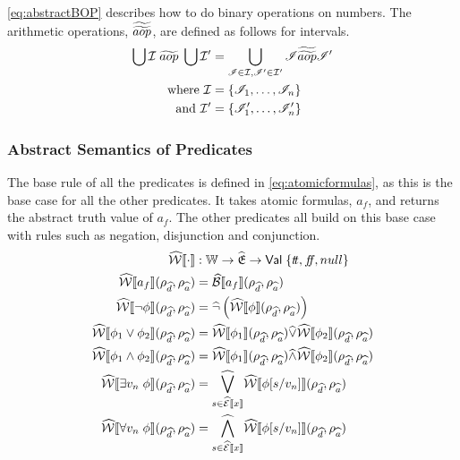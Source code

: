 \autoref{eq:abstractBOP} describes how to do binary operations on numbers.
The arithmetic operations, $\widetilde{\widetilde{aop}}$, are defined as follows for intervals.
\begin{align}\label{eq:abstractBOP}
    \bigcup \mathcal{I} \;\aab{aop}\; \bigcup \mathcal{I}' &= \bigcup_{\mathscr{I}\in \mathcal{I}, \mathscr{I}'\in \mathcal{I}'}\mathscr{I}\aaab{aop}\mathscr{I}'\\
    \text{where } \mathcal{I}&=\{\mathscr{I}_1,\dots,\mathscr{I}_n\}\nonumber\\
    \text{and } \mathcal{I}'&=\{\mathscr{I}'_1,\dots,\mathscr{I}'_n\}\nonumber
\end{align}

\subsubsection{Abstract Semantics of Predicates}
The base rule of all the predicates is defined in \autoref{eq:atomicformulas}, as this is the base case for all the other predicates.
It takes atomic formulas, $a_f$, and returns the abstract truth value of $a_f$.
The other predicates all build on this base case with rules such as negation, disjunction and conjunction.
\begin{align}
    \abspredsem{\cdot} &: \mathbb{W} \rightarrow \ab{\mathfrak{E}} \rightarrow \mathsf{Val} \; \{\true, \false, \mnull\} \\ \label{eq:atomicformulas}
    \abspredsem{a_f}(\rho_{\ab{d}}, \rho_{\ab{a}}) &= \absboolsem{a_f}(\rho_{\ab{d}}, \rho_{\ab{a}}) \\
    \abspredsem{\neg \phi}(\rho_{\ab{d}}, \rho_{\ab{a}}) &= \ab{\neg} \left( \abspredsem{\phi}(\rho_{\ab{d}}, \rho_{\ab{a}}) \right) \\
    \abspredsem{\phi_1 \lor \phi_2}(\rho_{\ab{d}}, \rho_{\ab{a}}) &= \abspredsem{\phi_1}(\rho_{\ab{d}}, \rho_{\ab{a}}) \ab{\lor} \abspredsem{\phi_2}(\rho_{\ab{d}}, \rho_{\ab{a}}) \\
    \abspredsem{\phi_1 \land \phi_2}(\rho_{\ab{d}}, \rho_{\ab{a}}) &= \abspredsem{\phi_1}(\rho_{\ab{d}}, \rho_{\ab{a}}) \ab{\land} \abspredsem{\phi_2}(\rho_{\ab{d}}, \rho_{\ab{a}}) \\
    \abspredsem{\exists v_n \; \phi}(\rho_{\ab{d}}, \rho_{\ab{a}}) &= \underset{s \in \absexpsem{x}}{\ab{\bigvee}} \abspredsem{\phi[s/v_n]}(\rho_{\ab{d}}, \rho_{\ab{a}}) \\
    \abspredsem{\forall v_n \; \phi}(\rho_{\ab{d}}, \rho_{\ab{a}}) &= \underset{s \in \absexpsem{x}}{\ab{\bigwedge}} \abspredsem{\phi[s/v_n]}(\rho_{\ab{d}}, \rho_{\ab{a}})
\end{align}

